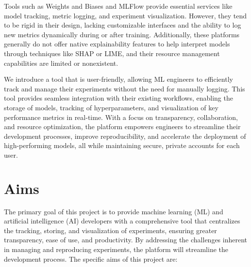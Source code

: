 \documentclass[12pt]{article}
\begin{document}
Tools such as Weights and Biases and MLFlow provide essential services like model tracking, metric logging, and experiment visualization. However, they tend to be rigid in their design, lacking customizable interfaces and the ability to log new metrics dynamically during or after training. Additionally, these platforms generally do not offer native explainability features to help interpret models through techniques like SHAP or LIME, and their resource management capabilities are limited or nonexistent. 

We introduce a tool that is user-friendly, allowing ML engineers to efficiently track and manage their experiments without the need for manually logging. This tool provides seamless integration with their existing workflows, enabling the storage of models, tracking of hyperparameters, and visualization of key performance metrics in real-time. With a focus on transparency, collaboration, and resource optimization, the platform empowers engineers to streamline their development processes, improve reproducibility, and accelerate the deployment of high-performing models, all while maintaining secure, private accounts for each user.


\section{Aims}
The primary goal of this project is to provide machine learning (ML) and artificial intelligence (AI) developers with a comprehensive tool that centralizes the tracking, storing, and visualization of experiments, ensuring greater transparency, ease of use, and productivity. By addressing the challenges inherent in managing and reproducing experiments, the platform will streamline the development process. The specific aims of this project are:
\end{document}
